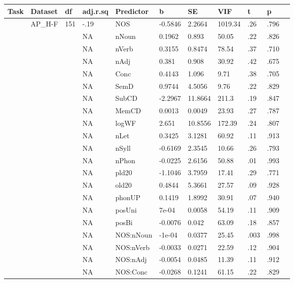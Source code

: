 \begin{table}[ht]
\centering
\begingroup\normalsize
\begin{tabular}{lllllllllll}
  \hline
Task & Dataset & df & adj.r.sq & Predictor & b & SE & VIF & t & p &  \\ 
  \hline
 & AP\_H-F & 151 & -.19 & NOS & -0.5846 & 2.2664 & 1019.34 & .26 & .796 &   \\ 
   &  &  & NA & nNoun & 0.1962 & 0.893 & 50.05 & .22 & .826 &   \\ 
   &  &  & NA & nVerb & 0.3155 & 0.8474 & 78.54 & .37 & .710 &   \\ 
   &  &  & NA & nAdj & 0.381 & 0.908 & 30.92 & .42 & .675 &   \\ 
   &  &  & NA & Conc & 0.4143 & 1.096 & 9.71 & .38 & .705 &   \\ 
   &  &  & NA & SemD & 0.9744 & 4.5056 & 9.76 & .22 & .829 &   \\ 
   &  &  & NA & SubCD & -2.2967 & 11.8664 & 211.3 & .19 & .847 &   \\ 
   &  &  & NA & MemCD & 0.0013 & 0.0049 & 23.93 & .27 & .787 &   \\ 
   &  &  & NA & logWF & 2.651 & 10.8556 & 172.39 & .24 & .807 &   \\ 
   &  &  & NA & nLet & 0.3425 & 3.1281 & 60.92 & .11 & .913 &   \\ 
   &  &  & NA & nSyll & -0.6169 & 2.3545 & 10.66 & .26 & .793 &   \\ 
   &  &  & NA & nPhon & -0.0225 & 2.6156 & 50.88 & .01 & .993 &   \\ 
   &  &  & NA & pld20 & -1.1046 & 3.7959 & 17.41 & .29 & .771 &   \\ 
   &  &  & NA & old20 & 0.4844 & 5.3661 & 27.57 & .09 & .928 &   \\ 
   &  &  & NA & phonUP & 0.1419 & 1.8992 & 30.91 & .07 & .940 &   \\ 
   &  &  & NA & posUni & 7e-04 & 0.0058 & 54.19 & .11 & .909 &   \\ 
   &  &  & NA & posBi & -0.0076 & 0.042 & 63.09 & .18 & .857 &   \\ 
   &  &  & NA & NOS:nNoun & -1e-04 & 0.0377 & 25.45 & .003 & .998 &   \\ 
   &  &  & NA & NOS:nVerb & -0.0033 & 0.0271 & 22.59 & .12 & .904 &   \\ 
   &  &  & NA & NOS:nAdj & -0.0054 & 0.0485 & 11.39 & .11 & .912 &   \\ 
   &  &  & NA & NOS:Conc & -0.0268 & 0.1241 & 61.15 & .22 & .829 &   \\ 

\end{tabular}
\end{table}
